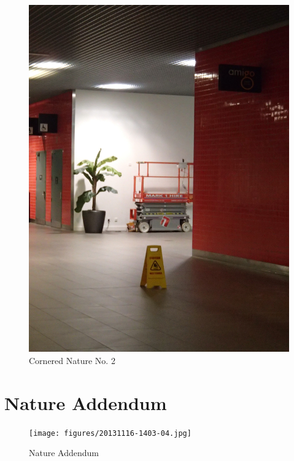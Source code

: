 \documentclass{book}
\begin{document}
\begin{figure}
\centering
\includegraphics[width=\textwidth,angle=-90]{figures/P1050158.JPG}
\caption{Cornered Nature No. 2}
\end{figure}

\chapter{Nature Addendum}

\begin{figure}
\centering
\texttt{[image: figures/20131116-1403-04.jpg]}
\caption{Nature Addendum}
\end{figure}
\end{document}
